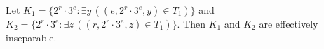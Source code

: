 Let $K_1 = \{2^r \cdot 3^e : \exists y\,((e, 2^r \cdot 3^e, y) \in T_1)\}$ and $K_2 = \{2^r \cdot 3^e : \exists z\,((r, 2^r \cdot 3^e, z) \in T_1)\}$. Then $K_1$ and $K_2$ are effectively inseparable.
